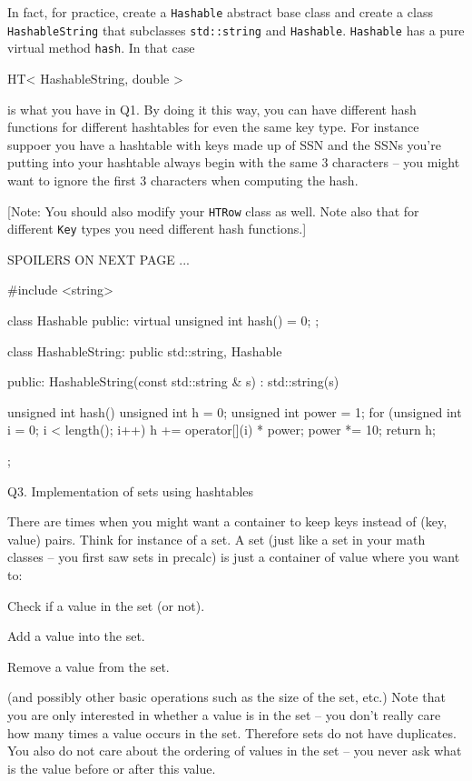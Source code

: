 In fact, for practice, create a \verb!Hashable! abstract base class
and create a class \verb!HashableString! that subclasses
\verb!std::string! and \verb!Hashable!.
\verb!Hashable! has a pure virtual method \verb!hash!.
In that case
{\small
\begin{console}
HT< HashableString, double >
\end{console}
}
is what you have in Q1.
By doing it this way, you can have different hash functions
for different hashtables for even the same key type.
For instance suppoer you have a hashtable with keys 
made up of SSN and the SSNs you're putting into your hashtable
always begin with the same 3 characters -- you might want to ignore
the first 3 characters when computing the hash.

[Note: You should also modify your \verb!HTRow! class as well.
Note also that for different \verb!Key! types you need different
hash functions.]

SPOILERS ON NEXT PAGE ...

\newpage

{\small
\begin{console}
#include <string>

class Hashable
{
public:
    virtual unsigned int hash() = 0;
};


class HashableString: public std::string, Hashable
{
public:
    HashableString(const std::string & s)
        : std::string(s)
    {}
    
    unsigned int hash()
    {
        unsigned int h = 0;
        unsigned int power = 1;
        for (unsigned int i = 0; i < length(); i++)
        {
            h += operator[](i) * power; power *= 10;
        }
        return h;
    }
};
\end{console}
}


\newpage
Q3. Implementation of sets using hashtables

There are times when you might want a container to keep
keys instead of (key, value) pairs.
Think for instance of a set.
A set (just like a set in your math classes -- you first saw
sets in precalc) is just a container of value
where you want to:
\begin{tightlist}
  \item Check if a value in the set (or not).
  \item Add a value into the set.
  \item Remove a value from the set.
\end{tightlist}
(and possibly other basic operations such as the size of the set, etc.)
Note that you are only interested in whether a value is in the set --
you don't really care how many times a value occurs in the set.
Therefore sets do not have duplicates.
You also do not care about the ordering of values in the set --
you never ask what is the value before or after this value.


